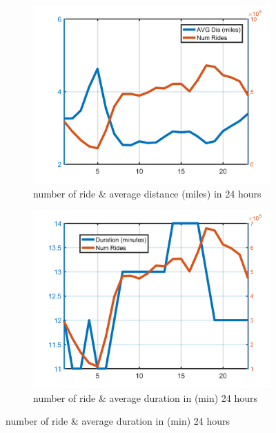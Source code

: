 \documentclass{article}
\begin{document}
\begin{figure}
\centering
\begin{subfigure}{.5\linewidth}
  \centering
  \includegraphics[width=.8\linewidth]{numride_tod}
  \caption{number of ride \& average distance (miles) in 24 hours}
  \label{fig:sub1}
\end{subfigure}%
\begin{subfigure}{.5\linewidth}
  \centering
  \includegraphics[width=.8\linewidth]{numride_tod_dur}
  \caption{number of ride \& average duration in (min) 24 hours}
  \label{fig:sub2}
\end{subfigure}


\end{figure}
\end{document}
